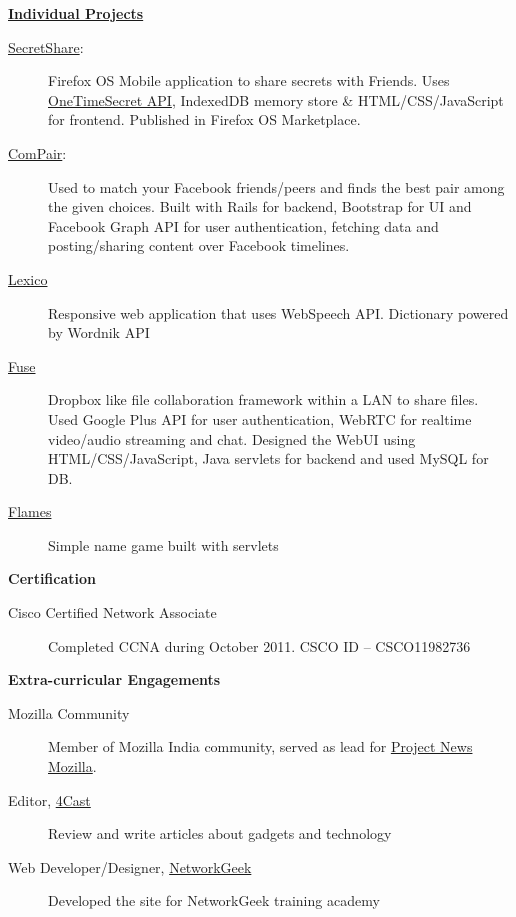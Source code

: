 \documentclass[letterpaper,11pt]{article}
\newcommand{\resheading}[1]{{\large \colorbox{mygrey}{\begin{minipage}{\textwidth}{\textbf{#1 \vphantom{p\^{E}}}}\end{minipage}}}}
\begin{document}
\resheading{\href{https://github.com/dtsdwarak/}{Individual Projects}}

\begin{description}
\item[\href{https://marketplace.firefox.com/app/secretshare}{SecretShare}:] { \footnotesize Firefox OS Mobile application to share secrets with Friends. Uses \href{https://onetimesecret.com/}{OneTimeSecret API}, IndexedDB memory store \& HTML/CSS/JavaScript for frontend. Published in Firefox OS Marketplace.}

\item[\href{http://compair-dtsdwarak.rhcloud.com/}{ComPair}:] { \footnotesize Used to match your Facebook friends/peers and finds the best pair among the given choices. Built with Rails for backend, Bootstrap for UI and Facebook Graph API for user authentication, fetching data and posting/sharing content over Facebook timelines.\color{red}{\bf Won the best creative appliation award at RedHat's OpenShift DevConf 2014, Czech Republic}}

\item[\href{https://dtsdwarak.github.io/lexico/}{Lexico}] { \footnotesize Responsive web application that uses WebSpeech API. Dictionary powered by Wordnik API}

\item[\href{https://github.com/dtsdwarak/fuse}{Fuse}] { \footnotesize Dropbox like file collaboration framework within a LAN to share files. Used Google Plus API for user authentication, WebRTC for realtime video/audio streaming and chat. Designed the WebUI using HTML/CSS/JavaScript, Java servlets for backend and used MySQL for DB.}

\item[\href{http://flames-dtsdwarak.rhcloud.com/}{Flames}] { \footnotesize Simple name game built with servlets}

\end{description}

\resheading{Certification}
\begin{description}

\item[Cisco Certified Network Associate] { \footnotesize Completed CCNA during October 2011. CSCO ID – CSCO11982736}

\end{description}

\newpage

\resheading{Extra-curricular Engagements} 

	\begin{description}
		\item[Mozilla Community] {\footnotesize Member of Mozilla India community, served as lead for \href{https://wiki.mozilla.org/NeMo}{Project News Mozilla}.}
		\item[Editor, \href{http://www.the4cast.com/author/dwarak}{4Cast}] {\footnotesize Review and write articles about gadgets and technology}
		\item[Web Developer/Designer, \href{http://networkgeek.in/}{NetworkGeek}] {\footnotesize Developed the site for NetworkGeek training academy}
	\end{description}
\end{document}
